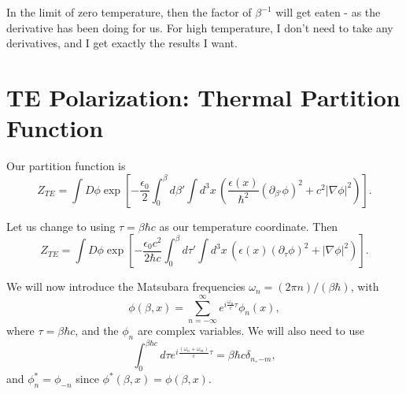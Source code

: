 In the limit of zero temperature, then the factor of $\beta^{-1}$ will get eaten - 
as the derivative has been doing for us. 
For high temperature, I don't need to take any derivatives, and I get exactly the results I want.       


\section{TE Polarization: Thermal Partition Function}

Our partition function is 
\begin{equation}
Z_{TE} = \int D\phi \exp\left[ -\frac{\epsilon_0}{2}\int_0^\beta d\beta'\int d^3x\, 
\left( \frac{\epsilon(x)}{\hbar^2}(\partial_{\beta'}\phi)^2 + c^2|\nabla\phi|^2\right)\right] .
\end{equation}

Let us change to using $\tau = \beta \hbar c$ as our temperature coordinate.  Then   
\begin{equation}
Z_{TE} = \int D\phi \exp\left[ -\frac{\epsilon_0 c^2 }{2 \hbar c}\int_0^\beta d\tau'\int d^3x\, 
\left( \epsilon(x)(\partial_{\tau}\phi)^2 + |\nabla\phi|^2\right)\right] .
\end{equation}

We will now introduce the Matsubara frequencies $\omega_n = (2\pi n)/(\beta \hbar)$, with 
\begin{equation}
\phi(\beta,x) = \sum_{n=-\infty}^{\infty}e^{i\frac{\omega_n}{c}\tau} \phi_n(x),
\end{equation}
where $\tau = \beta\hbar c$, and the $\phi_n$ are complex variables.  We will also need to use  
\begin{equation}
\int_0^{\beta \hbar c}d\tau e^{i\frac{(\omega_n+\omega_m)}{c}\tau} = \beta\hbar c \delta_{n,-m},
\end{equation}
and $\phi_n^* = \phi_{-n}$ since $\phi^*(\beta, x) = \phi(\beta, x)$.  

